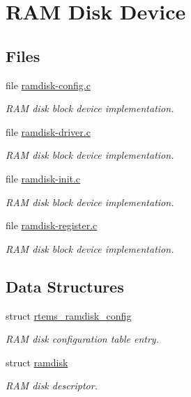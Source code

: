\hypertarget{group__rtems__ramdisk}{}\section{R\+AM Disk Device}
\label{group__rtems__ramdisk}
\subsection*{Files}
\begin{DoxyCompactItemize}
\item 
file \mbox{\hyperlink{ramdisk-config_8c}{ramdisk-\/config.\+c}}
\begin{DoxyCompactList}\small\item\em R\+AM disk block device implementation. \end{DoxyCompactList}\item 
file \mbox{\hyperlink{ramdisk-driver_8c}{ramdisk-\/driver.\+c}}
\begin{DoxyCompactList}\small\item\em R\+AM disk block device implementation. \end{DoxyCompactList}\item 
file \mbox{\hyperlink{ramdisk-init_8c}{ramdisk-\/init.\+c}}
\begin{DoxyCompactList}\small\item\em R\+AM disk block device implementation. \end{DoxyCompactList}\item 
file \mbox{\hyperlink{ramdisk-register_8c}{ramdisk-\/register.\+c}}
\begin{DoxyCompactList}\small\item\em R\+AM disk block device implementation. \end{DoxyCompactList}\end{DoxyCompactItemize}
\subsection*{Data Structures}
\begin{DoxyCompactItemize}
\item 
struct \mbox{\hyperlink{structrtems__ramdisk__config}{rtems\+\_\+ramdisk\+\_\+config}}
\begin{DoxyCompactList}\small\item\em R\+AM disk configuration table entry. \end{DoxyCompactList}\item 
struct \mbox{\hyperlink{structramdisk}{ramdisk}}
\begin{DoxyCompactList}\small\item\em R\+AM disk descriptor. \end{DoxyCompactList}\end{DoxyCompactItemize}
